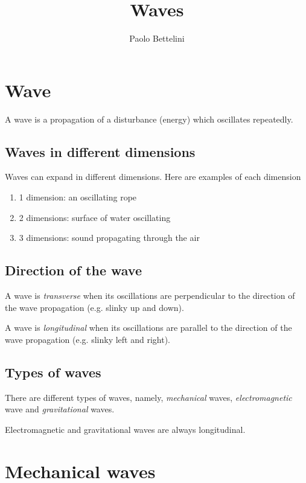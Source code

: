 \documentclass{article}
\title{Waves}
\author{Paolo Bettelini}
\date{}
\begin{document}
\maketitle

\tableofcontents

\pagebreak

\section{Wave}

A wave is a propagation of a disturbance (energy) which oscillates
repeatedly.

\subsection{Waves in different dimensions}

Waves can expand in different dimensions. Here are examples of each dimension
\begin{enumerate}
    \item 1 dimension: an oscillating rope
    \item 2 dimensions: surface of water oscillating
    \item 3 dimensions: sound propagating through the air
\end{enumerate}

\subsection{Direction of the wave}

A wave is \textit{transverse} when its oscillations are perpendicular
to the direction of the wave propagation (e.g. slinky up and down).

A wave is \textit{longitudinal} when its oscillations are parallel
to the direction of the wave propagation (e.g. slinky left and right).

\subsection{Types of waves}

There are different types of waves, namely,
\textit{mechanical} waves, \textit{electromagnetic} wave
and \textit{gravitational} waves.

Electromagnetic and gravitational waves are always longitudinal.

\section{Mechanical waves}
\end{document}
